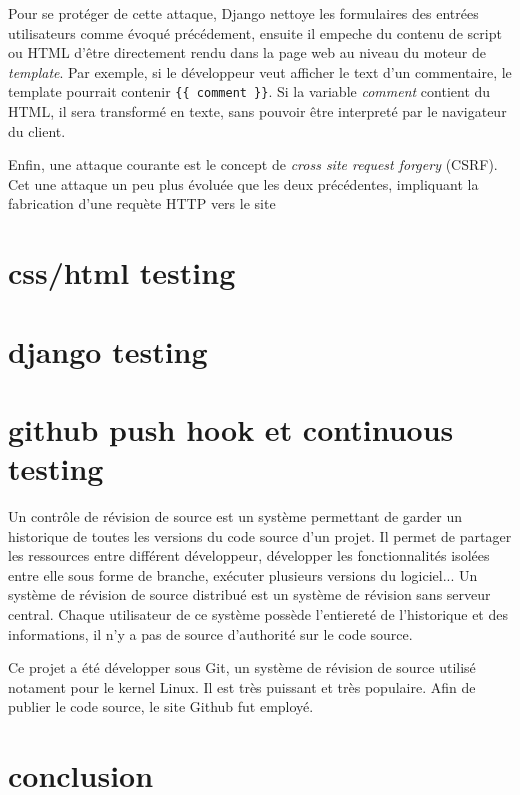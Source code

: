 \documentclass[a4paper,12pt]{article}
\begin{document}
Pour se protéger de cette attaque, Django nettoye les formulaires des entrées utilisateurs
comme évoqué précédement, ensuite il empeche du contenu de script ou HTML d'être directement
rendu dans la page web au niveau du moteur de \textit{template}. Par exemple,
si le développeur veut afficher le text d'un commentaire, le template pourrait contenir
\texttt{\{\{ comment \}\}}. Si la variable \textit{comment} contient du HTML,
il sera transformé en texte, sans pouvoir être interpreté par le navigateur du client.

Enfin, une attaque courante est le concept de \textit{cross site request forgery} (CSRF).
Cet une attaque un peu plus évoluée que les deux précédentes, impliquant la fabrication
d'une requète HTTP vers le site 


\section{css/html testing}
\section{django testing}
\section{github push hook et continuous testing}

Un contrôle de révision de source est un système permettant de garder un historique
de toutes les versions du code source d'un projet. Il permet de partager les ressources
entre différent développeur, développer les fonctionnalités isolées entre elle sous
forme de branche, exécuter plusieurs versions du logiciel... Un système de révision
de source distribué est un système de révision sans serveur central. Chaque
utilisateur de ce système possède l'entiereté de l'historique et des informations,
il n'y a pas de source d'authorité sur le code source.

Ce projet a été développer sous Git, un système de révision de source utilisé notament
pour le kernel Linux. Il est très puissant et très populaire. Afin de publier le code
source, le site Github fut employé.

\section{conclusion}
\end{document}
